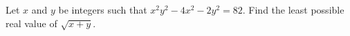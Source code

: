 Let $x$ and $y$ be integers such that $x^2y^2-4x^2-2y^2=82$. Find the least possible real value of $\sqrt{x+y}$.
